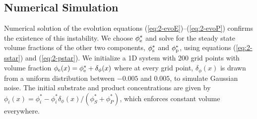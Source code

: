 \subsection{Numerical Simulation}

Numerical solution of the evolution equations (\ref{eq:2-evoE})--(\ref{eq:2-evoP}) confirms the existence of this instability. We choose $\phi_{\mathrm{e}}^*$ and solve for the steady state volume fractions of the other two components, $\phi_{\mathrm{s}}^*$ and $\phi_{\mathrm{p}}^*$, using equations (\ref{eq:2-sstar}) and (\ref{eq:2-pstar}). We initialize a 1D system with 200 grid points with volume fraction $\phi_{\mathrm{e}}(x) = \phi_{\mathrm{e}}^* + \delta_{\phi}(x)$ where at every grid point, $\delta_{\phi}(x)$ is drawn from a uniform distribution between $-0.005$ and $0.005$, to simulate Gaussian noise. The initial substrate and product concentrations are given by $\phi_i(x) = \phi_i^* - \phi_i^*\delta_{\phi}(x)/(\phi_S^*+\phi_P^*)$, which enforces constant volume everywhere.

